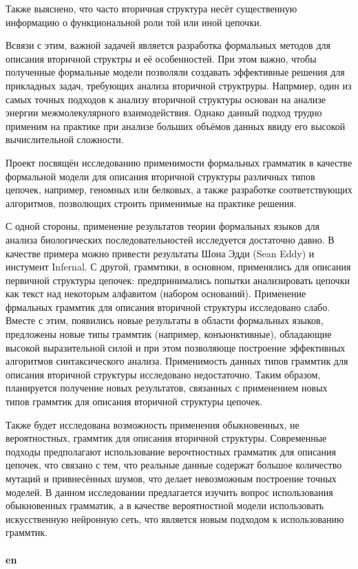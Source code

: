 ﻿\documentclass[12pt]{article}  %
\theoremstyle{remark}
\begin{document}
Также выяснено, что часто вторичная структура несёт существенную информацию о функциональной роли той или иной цепочки.

Всвязи с этим, важной задачей является разработка формальных методов для описания вторичной структры и её особенностей.
При этом важно, чтобы полученные формальные модели позволяли создавать эффективные решения для прикладных задач, требующих анализа вторичной структруры.
Напрмиер, один из самых точных подходов к анализу вторичной структуры основан на анализе энергии межмолекулярного взаимодействия.
Однако данный подход трудно применим на практике при анализе больших объёмов данных ввиду его высокой вычислительной сложности.

Проект посвящён исследованию применимости формальных грамматик в качестве формальной модели для описания вторичной структуры различных типов цепочек, например, геномных или белковых, а также разработке соответствующих алгоритмов, позволющих строить применимые на практике решения.

С одной стороны, применение результатов теории формальных языков для анализа биологических последовательностей исследуется достаточно давно.
В качестве примера можно привести результаты Шона Эдди (Sean Eddy) и инстумент Infernal.
С другой, граммтики, в основном, применялись для описания первичной структуры цепочек: предпринимались попытки анализировать цепочки как текст над некоторым алфавитом (набором оснований).
Применение фрмальных граммтик для описания вторичной структуры исследовано слабо.
Вместе с этим, появились новые результаты в области формальных языков, предложены новые типы граммтик (например, конъюнктивные), обладающие высокой выразительной силой и при этом позволяюще построение эффективных алгоритмов синтаксического анализа.
Применимость данных типов граммтик для описания вторичной структуры исследовано недостаточно.
Таким образом, планируется получение новых результатов, связанных с применением новых типов граммтик для описания вторичной структуры цепочек.

Также будет исследована возможность применения обыкновенных, не вероятностных, граммтик для описания вторичной структуры.
Современные подходы предполагают использование верочтностных грамматик для описания цепочек, что связано с тем, что реальные данные содержат большое количество мутаций и привнесённых шумов, что делает невозможным построение точных моделей.
В данном исследовании предлагается изучить вопрос использования обыкновенных грамматик, а в качестве вероятностной модели использовать искусственную нейронную сеть, что является новым подходом к использованию граммтик.
\\
\\
\textbf{en}\\
\end{document}
